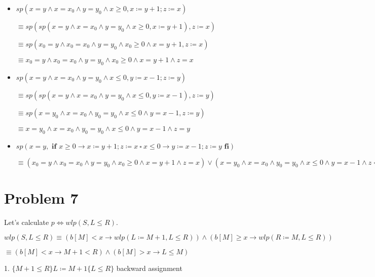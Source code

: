 \documentclass{article}
\begin{document}
\begin{itemize}
    \item $sp(x=y \wedge x=x_0 \wedge y=y_0 \wedge x \geq 0, x \coloneqq y+1; z \coloneqq x)$

\qquad \qquad \qquad  $ \equiv sp(sp(x=y \wedge x=x_0 \wedge y=y_0 \wedge x \geq 0, x \coloneqq y+1), z \coloneqq x)$

\qquad \qquad \qquad  $ \equiv sp(x_0=y \wedge x_0=x_0 \wedge y=y_0 \wedge x_0 \geq 0 \wedge x = y+1, z \coloneqq x)$

\qquad \qquad \qquad  $ \equiv x_0=y \wedge x_0=x_0 \wedge y=y_0 \wedge x_0 \geq 0 \wedge x = y+1 \wedge z = x$

    \item $sp(x=y \wedge x=x_0 \wedge y=y_0 \wedge x \leq 0, y \coloneqq x-1; z \coloneqq y)$

\qquad \qquad \qquad  $ \equiv sp(sp(x=y \wedge x=x_0 \wedge y=y_0 \wedge x \leq 0, y \coloneqq x-1), z \coloneqq y)$

\qquad \qquad \qquad  $ \equiv sp(x=y_0 \wedge x=x_0 \wedge y_0=y_0 \wedge x \leq 0 \wedge y = x-1, z \coloneqq y)$

\qquad \qquad \qquad  $ \equiv x=y_0 \wedge x=x_0 \wedge y_0=y_0 \wedge x \leq 0 \wedge y = x-1 \wedge z = y$

    \item $ sp(x=y, \textbf{ if } x \geq 0 \rightarrow x \coloneqq y+1; z \coloneqq x  \ \square \ x \leq 0 \rightarrow y \coloneqq x-1; z \coloneqq y \textbf{ fi}) $

\qquad \qquad \qquad  $\equiv (x_0=y \wedge x_0=x_0 \wedge y=y_0 \wedge x_0 \geq 0 \wedge x = y+1 \wedge z = x) \vee (x=y_0 \wedge x=x_0 \wedge y_0=y_0 \wedge x \leq 0 \wedge y = x-1 \wedge z = y)$

\end{itemize}


\section*{Problem 7}

Let's calculate $ p \Leftrightarrow wlp(S,L \leq R) $.

$ wlp(S,L \leq R) \equiv (b[M]<x \rightarrow wlp(L \coloneqq M+1, L \leq R)) \wedge (b[M] \geq x \rightarrow wlp(R \coloneqq M, L \leq R))$

\qquad \qquad \qquad $ \equiv (b[M]<x \rightarrow M+1<R) \wedge (b[M]>x \rightarrow L \leq M) $

1. $ \{M+1 \leq R\} L \coloneqq M+1 \{L \leq R\} $ \qquad \qquad \qquad \qquad \qquad \qquad backward assignment
\end{document}
